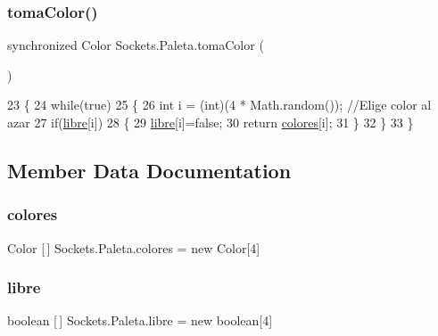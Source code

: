 \subsubsection{\texorpdfstring{toma\+Color()}{tomaColor()}}
{\footnotesize\ttfamily synchronized Color Sockets.\+Paleta.\+toma\+Color (\begin{DoxyParamCaption}{ }\end{DoxyParamCaption})\hspace{0.3cm}{\ttfamily [inline]}}


\begin{DoxyCode}
23     \{
24         \textcolor{keywordflow}{while}(\textcolor{keyword}{true})
25         \{
26             \textcolor{keywordtype}{int} i = (int)(4 * Math.random());    \textcolor{comment}{//Elige color al azar}
27             \textcolor{keywordflow}{if}(\mbox{\hyperlink{class_sockets_1_1_paleta_a836bc075d6bc794fbd6002483dda1534}{libre}}[i])
28             \{
29                 \mbox{\hyperlink{class_sockets_1_1_paleta_a836bc075d6bc794fbd6002483dda1534}{libre}}[i]=\textcolor{keyword}{false};
30                 \textcolor{keywordflow}{return} \mbox{\hyperlink{class_sockets_1_1_paleta_ad5cfd090a42fa589849afd28beebf4e5}{colores}}[i];
31             \}
32         \}
33     \}
\end{DoxyCode}


\subsection{Member Data Documentation}
\mbox{\label{class_sockets_1_1_paleta_ad5cfd090a42fa589849afd28beebf4e5}} 
\subsubsection{\texorpdfstring{colores}{colores}}
{\footnotesize\ttfamily Color \mbox{[}$\,$\mbox{]} Sockets.\+Paleta.\+colores = new Color\mbox{[}4\mbox{]}\hspace{0.3cm}{\ttfamily [private]}}

\mbox{\label{class_sockets_1_1_paleta_a836bc075d6bc794fbd6002483dda1534}} 
\subsubsection{\texorpdfstring{libre}{libre}}
{\footnotesize\ttfamily boolean \mbox{[}$\,$\mbox{]} Sockets.\+Paleta.\+libre = new boolean\mbox{[}4\mbox{]}\hspace{0.3cm}{\ttfamily [private]}}

